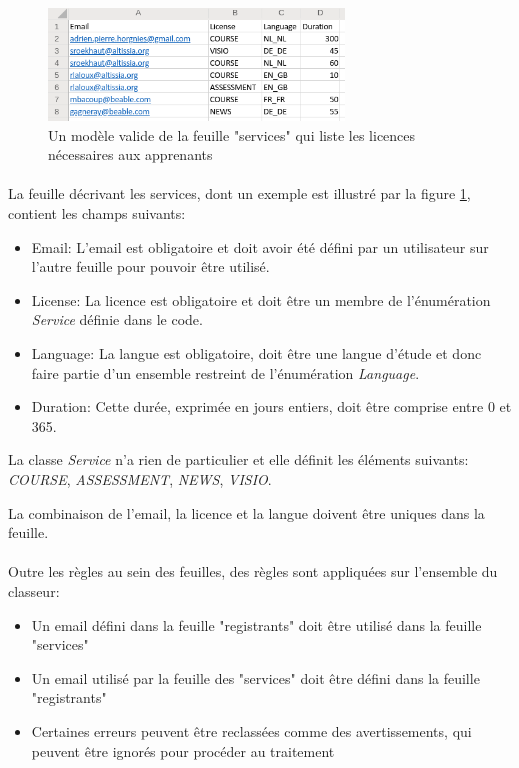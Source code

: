 \begin{figure}[ht]
    \centering
    \includegraphics[width=0.7\textwidth]{images/screenshot/sheet-services.png}
    \caption{Un modèle valide de la feuille "services" qui liste les licences nécessaires aux apprenants}
    \label{fig:sheet-services}
\end{figure}

\paragraph{}
La feuille décrivant les services, dont un exemple est illustré par la figure \ref{fig:sheet-services}, contient les champs suivants:
\begin{itemize}
    \item Email: L'email est obligatoire et doit avoir été défini par un utilisateur sur l'autre feuille pour pouvoir être utilisé.
    \item License: La licence est obligatoire et doit être un membre de l'énumération \textit{Service} définie dans le code.
    \item Language: La langue est obligatoire, doit être une langue d'étude et donc faire partie d'un ensemble restreint de l'énumération \textit{Language}.
    \item Duration: Cette durée, exprimée en jours entiers, doit être comprise entre 0 et 365.
\end{itemize}
La classe \textit{Service} n'a rien de particulier et elle définit les éléments suivants: \textit{COURSE}, \textit{ASSESSMENT}, \textit{NEWS}, \textit{VISIO}.

La combinaison de l'email, la licence et la langue doivent être uniques dans la feuille.

\paragraph{}
Outre les règles au sein des feuilles, des règles sont appliquées sur l'ensemble du classeur:
\begin{itemize}
    \item Un email défini dans la feuille "registrants" doit être utilisé dans la feuille "services"
    \item Un email utilisé par la feuille des "services" doit être défini dans la feuille "registrants"
    \item Certaines erreurs peuvent être reclassées comme des avertissements, qui peuvent être ignorés pour procéder au traitement
\end{itemize}

